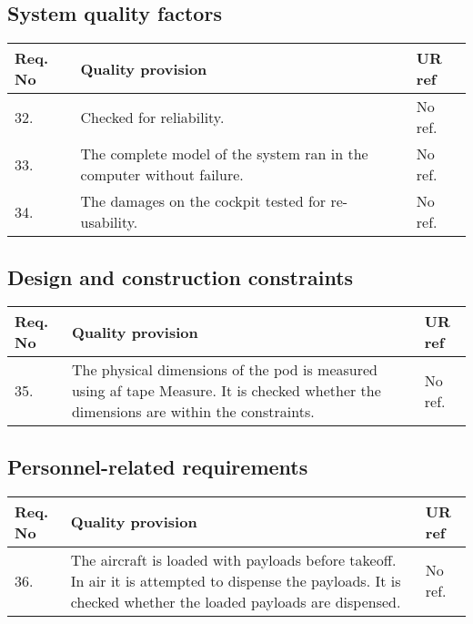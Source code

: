 \subsection{System quality factors}
\begin{center}
    \begin{tabular}{ | l | p{9cm} | l | }
    \hline
    Req. No & Quality provision  & UR ref \\ \hline
    32. & Checked for reliability. & No ref. \\ \hline
    33. & The complete model of the system ran in the computer without failure.& No ref.\\
\hline
34. & The damages on the cockpit tested for re-usability.& No ref. \\ \hline

    \end{tabular}
\end{center}

\subsection{Design and construction constraints}
\begin{center}
    \begin{tabular}{ | l | p{9cm} | l |}
    \hline
    Req. No & Quality provision  & UR ref \\ \hline
    35. & The physical dimensions of the pod is measured using af tape Measure. It is checked whether the dimensions are within the constraints. & No ref.\\ \hline
    \end{tabular}
\end{center}


\subsection{Personnel-related requirements}
\begin{center}
    \begin{tabular}{ | l | p{9cm} | l |}
    \hline
    Req. No & Quality provision  & UR ref \\ \hline
    36. & The aircraft is loaded with payloads before takeoff. In air it is attempted to dispense the payloads. It is checked whether the loaded payloads are dispensed. & No ref. \\ \hline
    \end{tabular}
\end{center}


